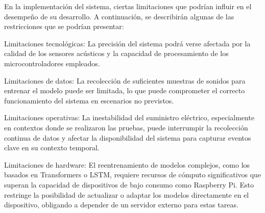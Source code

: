 
En la implementación del sistema, ciertas limitaciones que podrían influir en el desempeño de su desarrollo. A continuación, se describirán algunas de las restricciones que se podrían presentar:

Limitaciones tecnológicas: La precisión del sistema podrá verse afectada por la calidad de los sensores acústicos y la capacidad de procesamiento de los microcontroladores empleados.

Limitaciones de datos: La recolección de suficientes muestras de sonidos para entrenar el modelo puede ser limitada, lo que puede comprometer el correcto funcionamiento del sistema en escenarios no previstos.

Limitaciones operativas: La inestabilidad del suministro eléctrico, especialmente en contextos donde se realizaron las pruebas, puede interrumpir la recolección continua de datos y afectar la disponibilidad del sistema para capturar eventos clave en su contexto temporal.

Limitaciones de hardware: El reentrenamiento de modelos complejos, como los basados en Transformers o LSTM, requiere recursos de cómputo significativos que superan la capacidad de dispositivos de bajo consumo como Raspberry Pi. Esto restringe la posibilidad de actualizar o adaptar los modelos directamente en el dispositivo, obligando a depender de un servidor externo para estas tareas.

